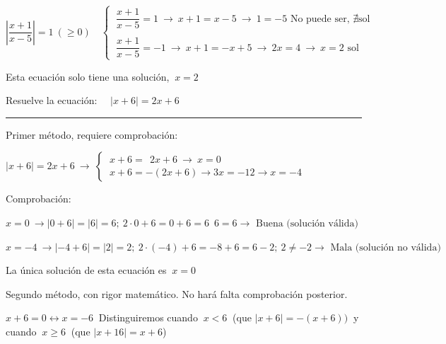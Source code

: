 \begin{miejemplo}
	
	$\left| \dfrac{x+1}{x-5} \right| = 1 \ (\ge 0) \quad \begin{cases}
 \ \dfrac{x+1}{x-5}=1  \ \to \ x+1=x-5 \ \to \ 1=-5 \text{ No puede ser, }  \nexists \text{sol} \\ \\
 \ \dfrac{x+1}{x-5}=-1  \ \to \ x+1=-x+5 \ \to \ 2x=4 \ \to \ x=2 \text{ sol}	
 \end{cases}$
 
\vspace{2mm}  Esta ecuación solo tiene una solución, $\ x=2$
\end{miejemplo}

\begin{miejercicio}

Resuelve la ecuación: $\quad |x+6|=2x+6$

\rule{250pt}{0.1pt}

\vspace{2mm} Primer método, requiere comprobación:

\vspace{2mm} $|x+6|=2x+6 \ \to \ \begin{cases}
\ x+6= \ \ 2x+6 \ \to \ x=0 \\
\ x+6=-(2x+6) \to 3x=-12 \to x=-4	
\end{cases}$


\vspace{2mm} Comprobación: 

\vspace{2mm} $x=0 \ \to |0+6|=|6|=6; \ 2\cdot 0+6=0+6=6\; \ 6=6 \to \text{ Buena (solución válida)}$

\vspace{2mm} $x=-4 \ \to |-4+6|=|2|=2; \ 2\cdot (-4)+6=-8+6=6-2; \ 2\neq -2 \to \text{ Mala (solución no válida)}$

\vspace{2mm} La única solución de esta ecuación es $\ x=0$

\vspace{5mm} Segundo método, con rigor matemático. No hará falta comprobación posterior.

\vspace{2mm} $x+6=0 \leftrightarrow x=-6\ $ Distinguiremos cuando $\ x<6\ $ (que $|x+6|=-(x+6)) \ $ y cuando $\ x\ge 6\ $ (que $|x+16|=x+6$)


\end{miejercicio}
